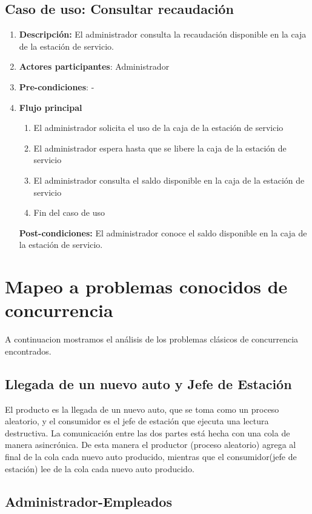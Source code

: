 \documentclass[12pt,a4paper,titlepage,oneside]{article}
\begin{document}
\subsection{Caso de uso: Consultar recaudación}

\begin{enumerate}
\item \textbf{Descripción:} El administrador consulta la recaudación disponible en la caja de la estación de servicio.
\item \textbf{Actores participantes}: Administrador
\item \textbf{Pre-condiciones}: -
\item \textbf{Flujo principal}
\begin{enumerate}
\item El administrador solicita el uso de la caja de la estación de servicio
\item El administrador espera hasta que se libere la caja de la estación de servicio
\item El administrador consulta el saldo disponible en la caja de la estación de servicio
\item Fin del caso de uso
\end{enumerate}
\textbf{Post-condiciones:} El administrador conoce el saldo disponible en la caja de la estación de servicio.
\end{enumerate}

\section{Mapeo a problemas conocidos de concurrencia}

A continuacion mostramos el análisis de los problemas clásicos de concurrencia encontrados.

\subsection*{Llegada de un nuevo auto y Jefe de Estación}

El producto es la llegada de un nuevo auto, que se toma como un proceso aleatorio, y el consumidor es el jefe de estación que ejecuta una lectura destructiva. La comunicación entre las dos partes está hecha con una cola de manera asincrónica. De esta manera el productor (proceso aleatorio) agrega al final de la cola cada nuevo auto producido, mientras que el consumidor(jefe de estación) lee de la cola cada nuevo auto producido.

\subsection*{Administrador-Empleados}
\end{document}

